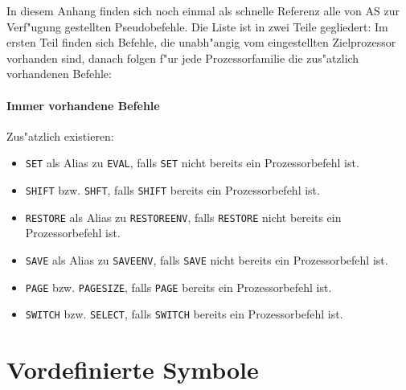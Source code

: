 \documentclass[12pt,a4paper,twoside]{report}
\newcommand{\tty}[1]{{\tt #1}}
\newcommand{\asname}{AS}
\begin{document}
In diesem Anhang finden sich noch einmal als schnelle Referenz alle
von \asname{} zur Verf"ugung gestellten Pseudobefehle.  Die Liste ist in zwei
Teile gegliedert: Im ersten Teil finden sich Befehle, die unabh"angig
vom eingestellten Zielprozessor vorhanden sind, danach folgen f"ur
jede Prozessorfamilie die zus"atzlich vorhandenen Befehle:

\subsubsection{Immer vorhandene Befehle}

Zus"atzlich existieren:
\begin{itemize}
\item{\tty{SET} als Alias zu \tty{EVAL}, falls \tty{SET} nicht bereits ein
      Prozessorbefehl ist.}
\item{\tty{SHIFT} bzw. \tty{SHFT}, falls \tty{SHIFT} bereits ein Prozessorbefehl
      ist.}
\item{\tty{RESTORE} als Alias zu \tty{RESTOREENV}, falls \tty{RESTORE} nicht bereits ein
      Prozessorbefehl ist.}
\item{\tty{SAVE} als Alias zu \tty{SAVEENV}, falls \tty{SAVE} nicht bereits ein
      Prozessorbefehl ist.}
\item{\tty{PAGE} bzw. \tty{PAGESIZE}, falls \tty{PAGE} bereits ein Prozessorbefehl
      ist.}
\item{\tty{SWITCH} bzw. \tty{SELECT}, falls \tty{SWITCH} bereits ein Prozessorbefehl
      ist.}
\end{itemize}

\newcommand{\pcsymname}{Symbol f"ur Programmz"ahler}



\cleardoublepage
\chapter{Vordefinierte Symbole}\label{AppInternSyms}
\end{document}

